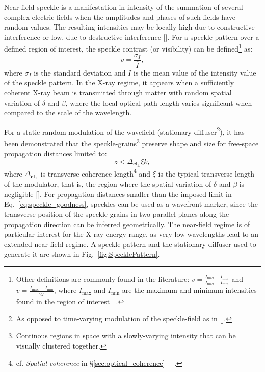 \begin{refsection}
Near-field speckle is a manifestation in intensity of the summation of several complex electric fields when the amplitudes and phases of such fields have random values. The resulting intensities may be locally high due to constructive interference or low, due to destructive interference [\cite[\textit{\S1}]{Goodman2020}]. For a speckle pattern over a defined region of interest, the speckle contrast (or visibility) can be defined\footnote{Other definitions are commonly found in the literature: $v=\frac{I_\text{max}-I_\text{min}}{I_\text{max}-I_\text{min}}$ and $v=\frac{I_\text{max}-I_\text{min}}{2\overline{I}}$, where $I_\text{max}$ and $I_\text{min}$ are the maximum and minimum intensities found in the region of interest [\cite{Zdora2018a}].} as:
\begin{equation}\label{eq:visibility}
    v=\frac{\sigma_I}{\overline{I}},
\end{equation}
where $\sigma_I$ is the standard deviation and $\overline{I}$ is the mean value of the intensity value of the speckle pattern. In the X-ray regime, it appears when a sufficiently coherent X-ray beam is transmitted through matter with random spatial variation of $\delta$ and $\beta$, where the local optical path length varies significant when compared to the scale of the wavelength.

For a static random modulation of the wavefield (stationary diffuser\footnote{As opposed to time-varying modulation of the speckle-field as in [\cite{Morgan2010,Goikhman2015}].}), it has been demonstrated that the speckle-grains\footnote{Continous regions in space with a slowly-varying intensity that can be visually clustered together.} preserve shape and size for free-space propagation distances limited to:
\begin{equation}\label{eq:speckle_goodness}
z<\Delta_{\textbf{cl}_\perp}\xi k,
\end{equation}
where $\Delta_{\textbf{cl}_\perp}$ is transverse coherence length\footnote{cf. \textit{Spatial coherence} in \S\ref{sec:optical_coherence}~-~\textit{}.} and $\xi$ is the typical transverse length of the modulator, that is, the region where the spatial variation of $\delta$ and $\beta$ is negligible [\cite{Cerbino2008}]. For propagation distances smaller than the imposed limit in Eq.~\ref{eq:speckle_goodness}, speckles can be used as a wavefront marker, since the transverse position of the speckle grains in two parallel planes along the propagation direction can be inferred geometrically. The near-field regime is of particular interest for the X-ray energy range, as very low wavelengths lead to an extended near-field regime. A speckle-pattern and the stationary diffuser used to generate it are shown in Fig.~\ref{fig:SpecklePattern}.


\end{refsection}
